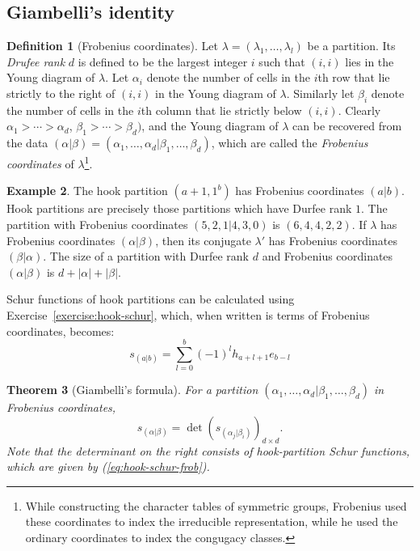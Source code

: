 \documentclass[11pt]{amsart}
\newtheorem{theorem}{Theorem}[subsection]
\theoremstyle{definition}
\newtheorem{definition}[theorem]{Definition}
\theoremstyle{example}
\newtheorem{example}[theorem]{Example}
\begin{document}
\subsection{Giambelli's identity}
\label{sec:giambelli}
\begin{definition}
  [Frobenius coordinates]
  Let $\lambda=(\lambda_1,\dotsc,\lambda_l)$ be a partition.
  Its \emph{Drufee rank} $d$ is defined to be the largest integer $i$ such that $(i,i)$ lies in the Young diagram of $\lambda$.
  Let $\alpha_i$ denote the number of cells in the $i$th row that lie strictly to the right of $(i,i)$ in the Young diagram of $\lambda$.
  Similarly let $\beta_i$ denote the number of cells in the $i$th column that lie strictly below $(i,i)$.
  Clearly $\alpha_1>\dotsb>\alpha_d$, $\beta_1>\dotsb>\beta_d)$, and the Young diagram of $\lambda$ can be recovered from the data $(\alpha|\beta)=(\alpha_1,\dotsc,\alpha_d|\beta_1,\dotsc,\beta_d)$, which are called the \emph{Frobenius coordinates} of $\lambda$\footnote{While constructing the character tables of symmetric groups, Frobenius used these coordinates to index the irreducible representation, while he used the ordinary coordinates to index the congugacy classes.}.
\end{definition}
\begin{example}
  The hook partition $(a+1,1^b)$ has Frobenius coordinates $(a|b)$.
  Hook partitions are precisely those partitions which have Durfee rank $1$.
  The partition with Frobenius coordinates $(5,2,1|4,3,0)$ is $(6,4,4,2,2)$.
  If $\lambda$ has Frobenius coordinates $(\alpha|\beta)$, then its conjugate $\lambda'$ has Frobenius coordinates $(\beta|\alpha)$.
  The size of a partition with Durfee rank $d$ and Frobenius coordinates $(\alpha|\beta)$ is $d+|\alpha|+|\beta|$. 
\end{example}
Schur functions of hook partitions can be calculated using Exercise~\ref{exercise:hook-schur}, which, when written is terms of Frobenius coordinates, becomes:
\begin{equation}
  \label{eq:hook-schur-frob}
  s_{(a|b)} = \sum_{l=0}^b (-1)^l h_{a+l+1}e_{b-l}
\end{equation}
\begin{theorem}
  [Giambelli's formula]
  For a partition $(\alpha_1,\dotsc,\alpha_d|\beta_1,\dotsc,\beta_d)$  in Frobenius coordinates,
  \begin{equation}
    \label{eq:giambelli}
    s_{(\alpha|\beta)} = \det(s_{(\alpha_j|\beta_i)})_{d\times d}.
  \end{equation}
  Note that the determinant on the right consists of hook-partition Schur functions, which are given by \textup{(\ref{eq:hook-schur-frob})}.
\end{theorem}
\end{document}
